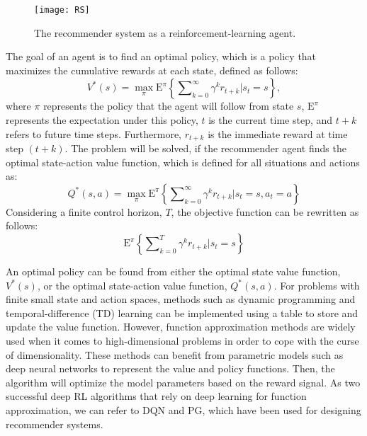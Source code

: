 \documentclass[journal]{IEEEtran}
\begin{document}
\begin{figure}
\begin{center}
\texttt{[image: RS]}    
\caption{The recommender system as a reinforcement-learning agent.} 
\label{RL_settting}
\end{center}
\end{figure}

The goal of an agent is to find an optimal policy, which is a policy that maximizes the cumulative rewards at each state, defined as follows:
\begin{equation}
{{V}^{*}}(s)={{\max }_{\pi }}{{\mathrm{E}}^{\pi }}\left\{ \sum\nolimits_{k=0}^{\infty }{{{\gamma }^{k}}{{r}_{t+k}}|{{s}_{t}}=s} \right\}, 
\label{eq1}
\end{equation}
where $\pi$ represents the policy that the agent will follow from state $s$, $\mathrm{E}^{\pi}$ represents the expectation under this policy,  $t$ is the current time step, and $t+k$ refers to future time steps. Furthermore, $r_{t+k}$ is the immediate reward at time step $(t+k)$. The problem will be solved, if the recommender agent finds the optimal state-action value function, which is defined for all situations and actions as:
\begin{equation}
{{Q}^{*}}(s,a)={{\max }_{\pi }}{{\mathrm{E}}^{\pi }}\left\{ \sum\nolimits_{k=0}^{\infty }{{{\gamma }^{k}}{{r}_{t+k}}|{{s}_{t}}=s,a_t=a} \right\} 
\label{eq2}
\end{equation}
Considering a finite control horizon, $T$, the objective function can be rewritten as follows:
\begin{equation}
{\mathrm{E}^{\pi }}\left\{ \sum\nolimits_{k=0}^{T}{{{\gamma }^{k}}{{r}_{t+k}}|{{s}_{t}}=s} \right\} 
\label{eq3}
\end{equation}

An optimal policy can be found from either the optimal state value function, ${V}^{*}(s)$, or the optimal state-action value function, ${Q}^{*}(s,a)$. For problems with finite small state and action spaces, methods such as dynamic programming and temporal-difference (TD) learning can be implemented using a table to store and update the value function. However, function approximation methods are widely used when it comes to high-dimensional problems in order to cope with the curse of dimensionality. These methods can benefit from parametric models such as deep neural networks to represent the value and policy functions. Then, the algorithm will optimize the model parameters based on the reward signal. As two successful deep RL algorithms that rely on deep learning for function approximation, we can refer to DQN and PG, which have been used for designing recommender systems. 
\end{document}
